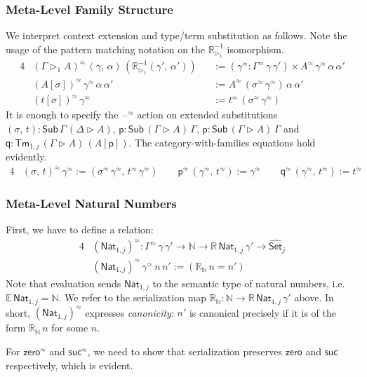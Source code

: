 \documentclass[acmsmall,screen]{acmart}
\newcommand{\msf}[1]{\mathsf{#1}}
\newcommand{\mbb}[1]{\mathbb{#1}}
\newcommand{\wh}[1]{\widehat{#1}}
\newcommand{\ext}{\triangleright}
\newcommand{\Sub}{\msf{Sub}}
\newcommand{\Tm}{\msf{Tm}}
\newcommand{\p}{\mathsf{p}}
\newcommand{\q}{\mathsf{q}}
\newcommand{\Nat}{\msf{Nat}}
\newcommand{\zero}{\msf{zero}}
\newcommand{\suc}{\msf{suc}}
\newcommand{\Set}{\mathsf{Set}}
\newcommand{\blank}{{\mathord{\hspace{1pt}\text{--}\hspace{1pt}}}}
\newcommand{\ev}{\mbb{E}}
\newcommand{\re}{\mbb{R}}
\theoremstyle{remark}
\newcommand{\whset}{\wh{\Set}}
\newcommand{\rexti}{\re_{\ext_1}^{-1}}
\newcommand{\rel}{^{\approx}}
\begin{document}
\subsubsection{Meta-Level Family Structure}
We interpret context extension and type/term substitution as follows. Note the
usage of the pattern matching notation on the $\rexti$ isomorphism.
\begin{alignat*}{4}
  & (\Gamma \ext_1 A)\rel\,(\gamma,\,\alpha)\,(\rexti(\gamma',\,\alpha')) && :=
    (\gamma\rel : \Gamma\rel\,\gamma\,\gamma') \times A\rel\,\gamma\rel\,\alpha\,\alpha'\\
  & (A[\sigma])\rel\,\gamma\rel\,\alpha\,\alpha' && := A\rel\,(\sigma\rel\,\gamma\rel)\,\alpha\,\alpha'\\
  & (t[\sigma])\rel\,\gamma\rel\                 && := t\rel\,(\sigma\rel\,\gamma\rel)
\end{alignat*}
It is enough to specify the $\blank\rel$ action on extended substitutions
$(\sigma,\,t) : \Sub\,\Gamma\,(\Delta\ext A)$, $\p : \Sub\,(\Gamma\ext
A)\,\Gamma$, $\p : \Sub\,(\Gamma\ext A)\,\Gamma$ and $\q : \Tm_{1,j}\,(\Gamma
\ext A)\,(A[\p])$. The category-with-families equations hold evidently.
\begin{alignat*}{4}
  & (\sigma,\,t)\rel\,\gamma\rel := (\sigma\rel\,\gamma\rel,\,t\rel\,\gamma\rel) \hspace{2em} \p\rel\,(\gamma\rel,\,t\rel) := \gamma\rel \hspace{2em} \q\rel\,(\gamma\rel,\,t\rel) := t\rel
\end{alignat*}

\subsubsection{Meta-Level Natural Numbers} First, we have to define a relation:
\begin{alignat*}{4}
  & (\Nat_{1,j})\rel : \Gamma\rel\,\gamma\,\gamma' \to \mbb{N} \to \re\,\Nat_{1,j}\,\gamma' \to \whset_j\\
  & (\Nat_{1,j})\rel\,\gamma\rel\,n\,n' := (\re_{\mbb{N}}\,n = n')
\end{alignat*}
Note that evaluation sends $\Nat_{1,j}$ to the semantic type of natural numbers,
i.e.\ $\ev\,\Nat_{1,j} = \mbb{N}$. We refer to the serialization map
$\re_{\mbb{N}} : \mbb{N} \to \re\,\Nat_{1,j}\,\gamma'$ above. In short,
$(\Nat_{1,j})\rel$ expresses \emph{canonicity}: $n'$ is canonical precisely if
it is of the form $\re_{\mbb{N}}\,n$ for some $n$.

For $\zero\rel$ and $\suc\rel$, we need to show that serialization preserves
$\zero$ and $\suc$ respectively, which is evident.
\end{document}
